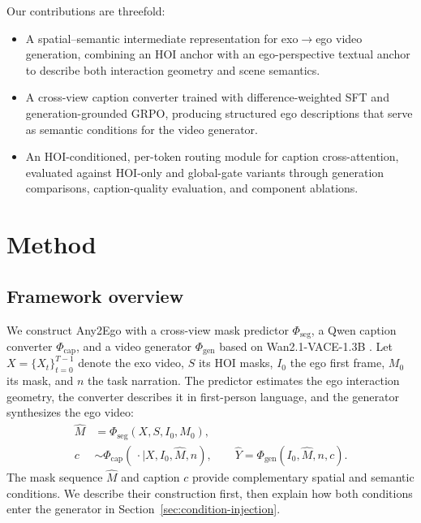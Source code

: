 \documentclass{article} %
\begin{document}
Our contributions are threefold:
\begin{itemize}
  \item A spatial--semantic intermediate representation for exo$\to$ego
  video generation, combining an HOI anchor with an ego-perspective
  textual anchor to describe both interaction geometry and scene semantics.
  \item A cross-view caption converter trained with difference-weighted
  SFT and generation-grounded GRPO, producing structured ego descriptions
  that serve as semantic conditions for the video generator.
  \item An HOI-conditioned, per-token routing module for caption
  cross-attention, evaluated against HOI-only and global-gate variants
  through generation comparisons, caption-quality evaluation, and
  component ablations.
\end{itemize}

\section{Method}
\label{sec:method}

\subsection{Framework overview}
\label{sec:overview}

We construct Any2Ego with a cross-view mask predictor $\Phi_{\mathrm{seg}}$,
a Qwen caption converter $\Phi_{\mathrm{cap}}$, and a video generator
$\Phi_{\mathrm{gen}}$ based on Wan2.1-VACE-1.3B \citep{wan2025,vace2025}.
Let $X=\{X_t\}_{t=0}^{T-1}$ denote the exo video, $S$ its HOI masks,
$I_0$ the ego first frame, $M_0$ its mask, and $n$ the task narration.
The predictor estimates the ego interaction geometry, the converter describes
it in first-person language, and the generator synthesizes the ego video:
\begin{equation}
\begin{aligned}
\widehat M &= \Phi_{\mathrm{seg}}(X,S,I_0,M_0),\\
c &\sim \Phi_{\mathrm{cap}}(\,\cdot\mid X,I_0,\widehat M,n),\qquad
\widehat Y = \Phi_{\mathrm{gen}}(I_0,\widehat M,n,c).
\end{aligned}
\label{eq:method-pipeline}
\end{equation}
The mask sequence $\widehat M$ and caption $c$ provide complementary spatial
and semantic conditions. We describe their construction first, then explain
how both conditions enter the generator in Section~\ref{sec:condition-injection}.
\end{document}
